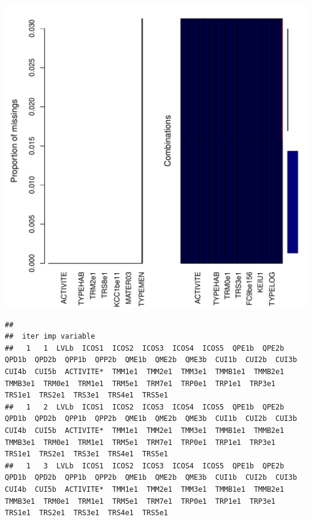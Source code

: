 \documentclass[11pt,a4paper, x11names]{article}\usepackage[]{graphicx}\usepackage[]{color}
\makeatletter
\def\maxwidth{ %
  \ifdim\Gin@nat@width>\linewidth
    \linewidth
  \else
    \Gin@nat@width
  \fi
}
\newenvironment{kframe}{%
 \def\at@end@of@kframe{}%
 \ifinner\ifhmode%
  \def\at@end@of@kframe{\end{minipage}}%
  \begin{minipage}{\columnwidth}%
 \fi\fi%
 \def\FrameCommand##1{\hskip\@totalleftmargin \hskip-\fboxsep
 \colorbox{shadecolor}{##1}\hskip-\fboxsep
     \hskip-\linewidth \hskip-\@totalleftmargin \hskip\columnwidth}%
 \MakeFramed {\advance\hsize-\width
   \@totalleftmargin\z@ \linewidth\hsize
   \@setminipage}}%
 {\par\unskip\endMakeFramed%
 \at@end@of@kframe}
\newenvironment{knitrout}{}{} %
\makeatother
\begin{document}
\begin{knitrout}
\color{fgcolor}
\includegraphics[width=\maxwidth]{figure/unnamed-chunk-12-1} 
\begin{kframe}\begin{verbatim}
## 
##  iter imp variable
##   1   1  LVLb  ICOS1  ICOS2  ICOS3  ICOS4  ICOS5  QPE1b  QPE2b  QPD1b  QPD2b  QPP1b  QPP2b  QME1b  QME2b  QME3b  CUI1b  CUI2b  CUI3b  CUI4b  CUI5b  ACTIVITE*  TMM1e1  TMM2e1  TMM3e1  TMMB1e1  TMMB2e1  TMMB3e1  TRM0e1  TRM1e1  TRM5e1  TRM7e1  TRP0e1  TRP1e1  TRP3e1  TRS1e1  TRS2e1  TRS3e1  TRS4e1  TRS5e1
##   1   2  LVLb  ICOS1  ICOS2  ICOS3  ICOS4  ICOS5  QPE1b  QPE2b  QPD1b  QPD2b  QPP1b  QPP2b  QME1b  QME2b  QME3b  CUI1b  CUI2b  CUI3b  CUI4b  CUI5b  ACTIVITE*  TMM1e1  TMM2e1  TMM3e1  TMMB1e1  TMMB2e1  TMMB3e1  TRM0e1  TRM1e1  TRM5e1  TRM7e1  TRP0e1  TRP1e1  TRP3e1  TRS1e1  TRS2e1  TRS3e1  TRS4e1  TRS5e1
##   1   3  LVLb  ICOS1  ICOS2  ICOS3  ICOS4  ICOS5  QPE1b  QPE2b  QPD1b  QPD2b  QPP1b  QPP2b  QME1b  QME2b  QME3b  CUI1b  CUI2b  CUI3b  CUI4b  CUI5b  ACTIVITE*  TMM1e1  TMM2e1  TMM3e1  TMMB1e1  TMMB2e1  TMMB3e1  TRM0e1  TRM1e1  TRM5e1  TRM7e1  TRP0e1  TRP1e1  TRP3e1  TRS1e1  TRS2e1  TRS3e1  TRS4e1  TRS5e1

\end{verbatim}
\end{kframe}
\end{knitrout}
\end{document}
